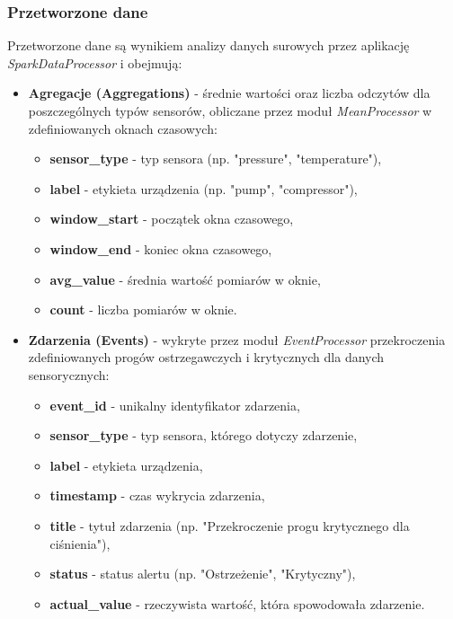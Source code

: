 \newpage

\subsubsection{Przetworzone dane}
\label{subsubsec:przetworzone_dane}

Przetworzone dane są wynikiem analizy danych surowych przez aplikację \textit{\mbox{SparkDataProcessor}} i obejmują:

\begin{itemize}
    \setlength\itemsep{0.5em}
    \item \textbf{Agregacje (Aggregations)} - średnie wartości oraz liczba odczytów dla poszczególnych typów sensorów, obliczane przez moduł \textit{\mbox{MeanProcessor}} w zdefiniowanych oknach czasowych:
    \begin{itemize}
        \item \textbf{sensor\_type} - typ sensora (np. "pressure", "temperature"),
        \item \textbf{label} - etykieta urządzenia (np. "pump", "compressor"),
        \item \textbf{window\_start} - początek okna czasowego,
        \item \textbf{window\_end} - koniec okna czasowego,
        \item \textbf{avg\_value} - średnia wartość pomiarów w oknie,
        \item \textbf{count} - liczba pomiarów w oknie.
    \end{itemize}
    
    \item \textbf{Zdarzenia (Events)} - wykryte przez moduł \textit{\mbox{EventProcessor}} przekroczenia zdefiniowanych progów ostrzegawczych i krytycznych dla danych sensorycznych:
    \begin{itemize}
        \item \textbf{event\_id} - unikalny identyfikator zdarzenia,
        \item \textbf{sensor\_type} - typ sensora, którego dotyczy zdarzenie,
        \item \textbf{label} - etykieta urządzenia,
        \item \textbf{timestamp} - czas wykrycia zdarzenia,
        \item \textbf{title} - tytuł zdarzenia (np. "Przekroczenie progu krytycznego dla ciśnienia"),
        \item \textbf{status} - status alertu (np. "Ostrzeżenie", "Krytyczny"),
        \item \textbf{actual\_value} - rzeczywista wartość, która spowodowała zdarzenie.
    \end{itemize}
    

\end{itemize}
